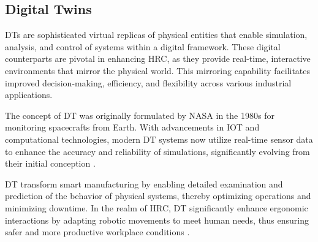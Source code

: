 



\subsection{Digital Twins}

\ac{DTs} are sophisticated virtual replicas of physical entities that enable simulation, analysis, and control of systems within a digital framework. 
These digital counterparts are pivotal in enhancing \ac{HRC}, as they provide real-time, interactive environments that mirror the physical world. 
This mirroring capability facilitates improved decision-making, efficiency, and flexibility across various industrial applications.

The concept of \ac{DT} was originally formulated by NASA in the 1980s for monitoring spacecrafts from Earth. With advancements in \ac{IOT} and 
computational technologies, modern \ac{DT} systems now utilize real-time sensor data to enhance the accuracy and reliability of simulations, 
significantly evolving from their initial conception \cite{liu2022digitaltwin}.

\ac{DT} transform smart manufacturing by enabling detailed examination and prediction of the behavior of physical systems, thereby optimizing operations 
and minimizing downtime. In the realm of \ac{HRC}, \ac{DT} significantly enhance ergonomic interactions by adapting robotic movements to meet human needs,
thus ensuring safer and more productive workplace conditions \cite{8477101}.

